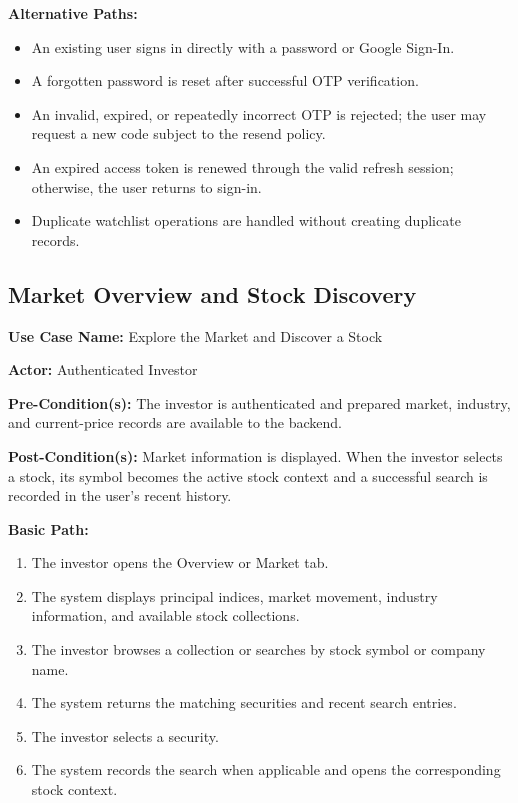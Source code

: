 \noindent\textbf{Alternative Paths:}
\begin{itemize}[leftmargin=*, nosep]
    \item An existing user signs in directly with a password or Google Sign-In.
    \item A forgotten password is reset after successful OTP verification.
    \item An invalid, expired, or repeatedly incorrect OTP is rejected; the user may request a new code subject to the resend policy.
    \item An expired access token is renewed through the valid refresh session; otherwise, the user returns to sign-in.
    \item Duplicate watchlist operations are handled without creating duplicate records.
\end{itemize}

\subsection{Market Overview and Stock Discovery}
\label{subsec:market-overview-discovery}

\noindent\textbf{Use Case Name:} Explore the Market and Discover a Stock

\noindent\textbf{Actor:} Authenticated Investor

\noindent\textbf{Pre-Condition(s):} The investor is authenticated and prepared market, industry, and current-price records are available to the backend.

\noindent\textbf{Post-Condition(s):} Market information is displayed. When the investor selects a stock, its symbol becomes the active stock context and a successful search is recorded in the user's recent history.

\noindent\textbf{Basic Path:}
\begin{enumerate}[leftmargin=*, nosep]
    \item The investor opens the Overview or Market tab.
    \item The system displays principal indices, market movement, industry information, and available stock collections.
    \item The investor browses a collection or searches by stock symbol or company name.
    \item The system returns the matching securities and recent search entries.
    \item The investor selects a security.
    \item The system records the search when applicable and opens the corresponding stock context.
\end{enumerate}

